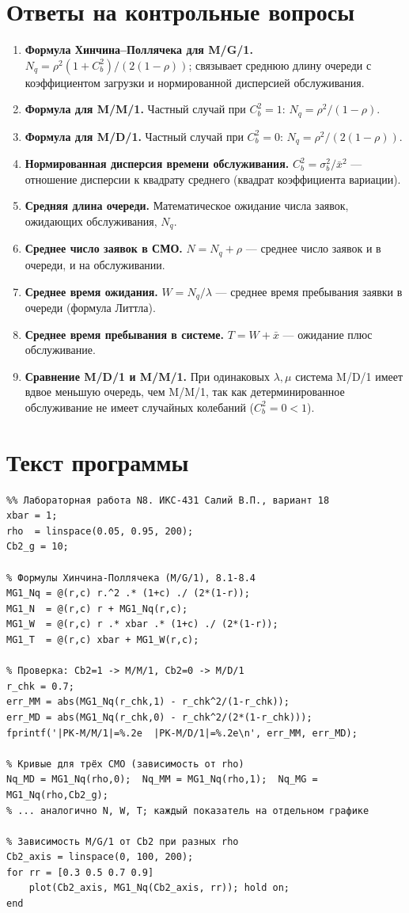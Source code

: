 \documentclass[a4paper,14pt,oneside,openany]{memoir}
\begin{document}
\section*{Ответы на контрольные вопросы}
\begin{enumerate}
    \item \textbf{Формула Хинчина--Поллячека для M/G/1.} $N_q=\rho^2(1+C_b^2)/(2(1-\rho))$; связывает среднюю длину очереди с коэффициентом загрузки и нормированной дисперсией обслуживания.
    \item \textbf{Формула для M/M/1.} Частный случай при $C_b^2=1$: $N_q=\rho^2/(1-\rho)$.
    \item \textbf{Формула для M/D/1.} Частный случай при $C_b^2=0$: $N_q=\rho^2/(2(1-\rho))$.
    \item \textbf{Нормированная дисперсия времени обслуживания.} $C_b^2=\sigma_b^2/\bar{x}^2$ --- отношение дисперсии к квадрату среднего (квадрат коэффициента вариации).
    \item \textbf{Средняя длина очереди.} Математическое ожидание числа заявок, ожидающих обслуживания, $N_q$.
    \item \textbf{Среднее число заявок в СМО.} $N=N_q+\rho$ --- среднее число заявок и в очереди, и на обслуживании.
    \item \textbf{Среднее время ожидания.} $W=N_q/\lambda$ --- среднее время пребывания заявки в очереди (формула Литтла).
    \item \textbf{Среднее время пребывания в системе.} $T=W+\bar{x}$ --- ожидание плюс обслуживание.
    \item \textbf{Сравнение M/D/1 и M/M/1.} При одинаковых $\lambda,\mu$ система M/D/1 имеет вдвое меньшую очередь, чем M/M/1, так как детерминированное обслуживание не имеет случайных колебаний ($C_b^2=0<1$).
\end{enumerate}

\section{Текст программы}
\begin{verbatim}
%% Лабораторная работа N8. ИКС-431 Салий В.П., вариант 18
xbar = 1;
rho  = linspace(0.05, 0.95, 200);
Cb2_g = 10;

% Формулы Хинчина-Поллячека (M/G/1), 8.1-8.4
MG1_Nq = @(r,c) r.^2 .* (1+c) ./ (2*(1-r));
MG1_N  = @(r,c) r + MG1_Nq(r,c);
MG1_W  = @(r,c) r .* xbar .* (1+c) ./ (2*(1-r));
MG1_T  = @(r,c) xbar + MG1_W(r,c);

% Проверка: Cb2=1 -> M/M/1, Cb2=0 -> M/D/1
r_chk = 0.7;
err_MM = abs(MG1_Nq(r_chk,1) - r_chk^2/(1-r_chk));
err_MD = abs(MG1_Nq(r_chk,0) - r_chk^2/(2*(1-r_chk)));
fprintf('|PK-M/M/1|=%.2e  |PK-M/D/1|=%.2e\n', err_MM, err_MD);

% Кривые для трёх СМО (зависимость от rho)
Nq_MD = MG1_Nq(rho,0);  Nq_MM = MG1_Nq(rho,1);  Nq_MG = MG1_Nq(rho,Cb2_g);
% ... аналогично N, W, T; каждый показатель на отдельном графике

% Зависимость M/G/1 от Cb2 при разных rho
Cb2_axis = linspace(0, 100, 200);
for rr = [0.3 0.5 0.7 0.9]
    plot(Cb2_axis, MG1_Nq(Cb2_axis, rr)); hold on;
end
\end{verbatim}
\end{document}
